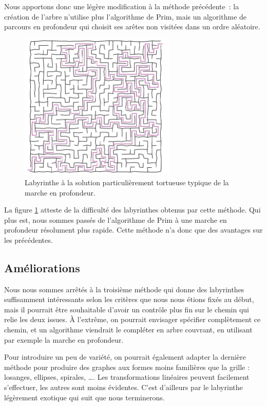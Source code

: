 \documentclass[a4paper, 10pt]{article}
\begin{document}
Nous apportons donc une légère modification à la méthode précédente~:
la création de l'arbre n'utilise plus l'algorithme de Prim, mais un
algorithme de parcours en profondeur qui choisit ses arêtes non
visitées dans un ordre aléatoire.

\begin{figure}[hbt]
  \centering
  \includegraphics[height=7cm]{laby-depth.png}
  \caption{Labyrinthe à la solution particulièrement tortueuse typique
    de la marche en profondeur.}
  \label{fig:laby-depth}
\end{figure}

La figure \ref{fig:laby-depth} atteste de la difficulté des
labyrinthes obtenus par cette méthode. Qui plus est, nous sommes
passés de l'algorithme de Prim à une marche en profondeur résolument
plus rapide. Cette méthode n'a donc que des avantages sur les
précédentes.

\subsection*{Améliorations}

Nous nous sommes arrêtés à la troisième méthode qui donne des
labyrinthes suffisamment intéressants selon les critères que nous nous
étions fixés au début, mais il pourrait être souhaitable d'avoir un
contrôle plus fin sur le chemin qui relie les deux issues. À
l'extrême, on pourrait envisager spécifier complètement ce chemin, et
un algorithme viendrait le compléter en arbre couvrant, en utilisant
par exemple la marche en profondeur.

Pour introduire un peu de variété, on pourrait également adapter la
dernière méthode pour produire des graphes aux formes moins familières
que la grille : losanges, ellipses, spirales, \dots. Les
transformations linéaires peuvent facilement s'effectuer, les autres
sont moins évidentes. C'est d'ailleurs par le labyrinthe légèrement
exotique qui suit que nous terminerons.
\end{document}
